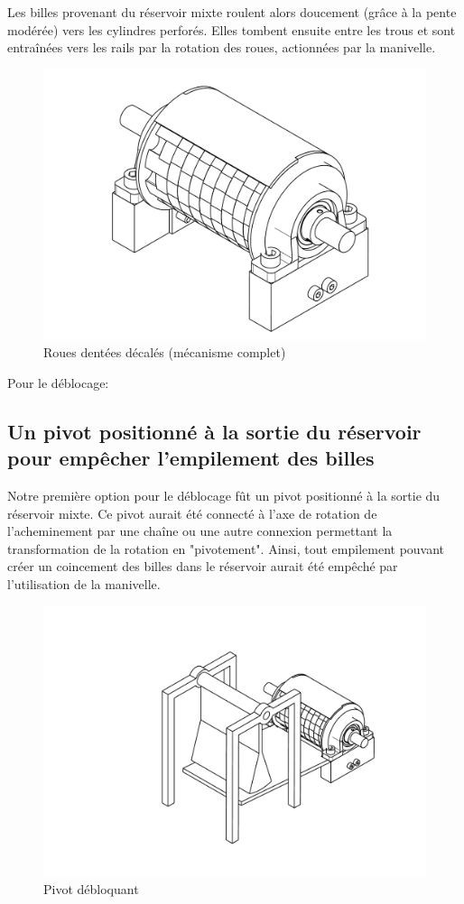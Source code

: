 Les billes provenant du réservoir mixte roulent alors doucement (grâce à la pente modérée)  vers les cylindres perforés. Elles tombent ensuite entre les trous et sont entraînées vers les rails par la rotation des roues, actionnées par la manivelle.

\begin{figure}
    \centering
    \includegraphics[width=\textwidth]{Graphics/Roue/DRAWING_COUVERCLE_COMPLET.pdf}
    \caption{Roues dentées décalés (mécanisme complet)}
\end{figure}

Pour le déblocage:
\subsection{Un pivot positionné à la sortie du réservoir pour empêcher l'empilement des billes} 
Notre première option pour le déblocage fût un pivot positionné à la sortie du réservoir mixte. Ce pivot aurait été connecté à l'axe de rotation de l'acheminement par une chaîne ou une autre connexion permettant la transformation de la rotation en "pivotement". Ainsi, tout empilement pouvant créer un coincement des billes dans le réservoir aurait été empêché par l'utilisation de la manivelle.

\begin{figure}
    \centering
    \includegraphics[width=\textwidth]{Graphics/Roue/DRAWING_PIVOT.pdf}
    \caption{Pivot débloquant}
\end{figure}

